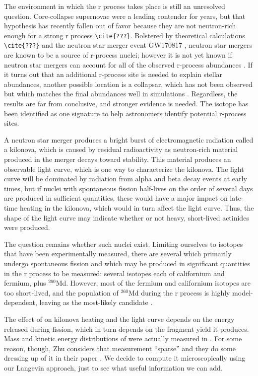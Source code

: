 The environment in which the r process takes place is still an unresolved question. Core-collapse supernovae were a leading contender for years, but that hypothesis has recently fallen out of favor because they are not neutron-rich enough for a strong r process \verb|\cite{???}|. Bolstered by theoretical calculations \verb|\cite{???}| and the neutron star merger event GW170817 \cite{Abbott2017,Abbott2017a}, neutron star mergers are known to be a source of r-process nuclei; however it is not yet known if neutron star mergers can account for all of the observed r-process abundances \cite{Pian2017,Kasen2017}. If it turns out that an additional r-process site is needed to explain stellar abundances, another possible location is a collapsar, which has not been observed but which matches the final abundances well in simulations \cite{Nakamura2013,Siegel2018}. Regardless, the results are far from conclusive, and stronger evidence is needed. The isotope {\Cf} has been identified as one signature to help astronomers identify potential r-process sites.

A neutron star merger produces a bright burst of electromagnetic radiation called a kilonova, which is caused by residual radioactivity as neutron-rich material produced in the merger decays toward stability. This material produces an observable light curve, which is one way to characterize the kilonova. The light curve will be dominated by radiation from alpha and beta decay events at early times, but if nuclei with spontaneous fission half-lives on the order of several days are produced in sufficient quantities, these would have a major impact on late-time heating in the kilonova, which would in turn affect the light curve. Thus, the shape of the light curve may indicate whether or not heavy, short-lived actinides were produced.

The question remains whether such nuclei exist. Limiting ourselves to isotopes that have been experimentally measured, there are several which primarily undergo spontaneous fission and which may be produced in significant quantities in the r process to be measured: several isotopes each of californium and fermium, plus $^{260}$Md. However, most of the fermium and californium isotopes are too short-lived, and the population of $^{260}$Md during the r process is highly model-dependent, leaving {\Cf} as the most-likely candidate \cite{Zhu2018}.


The effect of {\Cf} on kilonova heating and the light curve depends on the energy released during fission, which in turn depends on the fragment yield it produces. Mass and kinetic energy distributions of {\Cf} were actually measured in \cite{Brandt1963}. For some reason, though, Zhu considers that measurement ``sparse'' and they do some dressing up of it in their paper \cite{Zhu2018}. We decide to compute it microscopically using our Langevin approach, just to see what useful information we can add.



